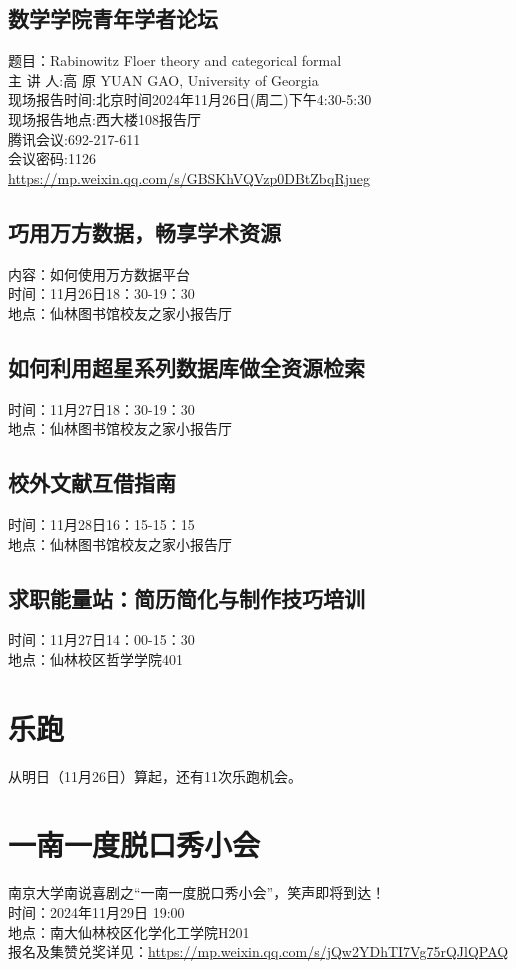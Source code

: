 \documentclass[letterpaper, 12pt]{article}
\begin{document}
\begin{multicols}{2}
\subsection{数学学院青年学者论坛}
题目：Rabinowitz Floer theory and categorical formal\\
主 讲 人:高 原 YUAN GAO, University of Georgia\\
现场报告时间:北京时间2024年11月26日(周二)下午4:30-5:30\\
现场报告地点:西大楼108报告厅\\
腾讯会议:692-217-611\\
会议密码:1126\\
\url{https://mp.weixin.qq.com/s/GBSKhVQVzp0DBtZbqRjueg}\\

\subsection{巧用万方数据，畅享学术资源}
内容：如何使用万方数据平台\\
时间：11月26日18：30-19：30\\
地点：仙林图书馆校友之家小报告厅\\

\subsection{如何利用超星系列数据库做全资源检索}
时间：11月27日18：30-19：30\\
地点：仙林图书馆校友之家小报告厅\\

\subsection{校外文献互借指南}
时间：11月28日16：15-15：15\\
地点：仙林图书馆校友之家小报告厅\\

\subsection{求职能量站：简历简化与制作技巧培训}
时间：11月27日14：00-15：30\\
地点：仙林校区哲学学院401\\
\section{乐跑}
从明日（11月26日）算起，还有11次乐跑机会。
\section{一南一度脱口秀小会}
南京大学南说喜剧之“一南一度脱口秀小会”，笑声即将到达！\\
时间：2024年11月29日 19:00\\
地点：南大仙林校区化学化工学院H201\\
报名及集赞兑奖详见：\url{https://mp.weixin.qq.com/s/jQw2YDhTI7Vg75rQJlQPAQ}\\


\end{multicols}
\end{document}
